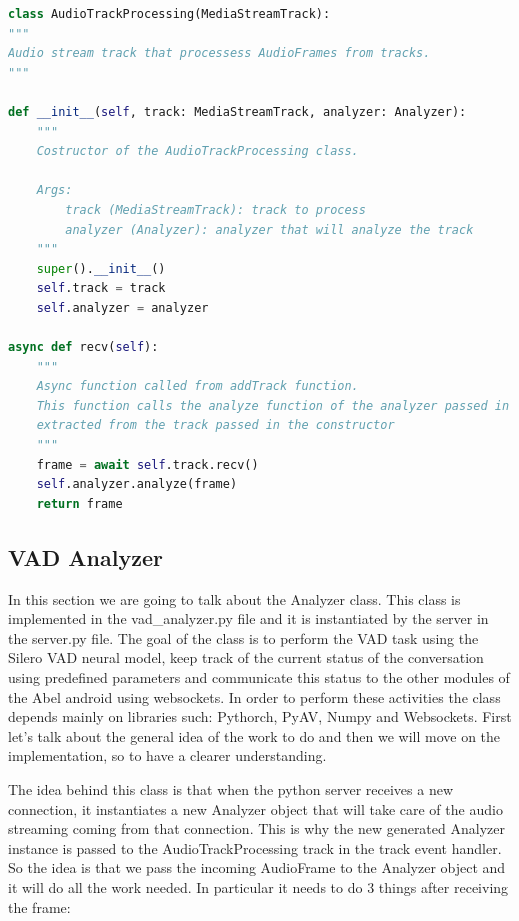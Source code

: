 \documentclass[../main.tex]{subfiles}
\begin{document}
\begin{lstlisting}[language=Python, caption=AudioTrackProcessing class implementation]
class AudioTrackProcessing(MediaStreamTrack):
"""
Audio stream track that processess AudioFrames from tracks.
"""

def __init__(self, track: MediaStreamTrack, analyzer: Analyzer):
    """
    Costructor of the AudioTrackProcessing class.

    Args:
        track (MediaStreamTrack): track to process
        analyzer (Analyzer): analyzer that will analyze the track
    """
    super().__init__()
    self.track = track
    self.analyzer = analyzer

async def recv(self):
    """
    Async function called from addTrack function.
    This function calls the analyze function of the analyzer passed in the constructor on the AudioFrame
    extracted from the track passed in the constructor
    """
    frame = await self.track.recv()
    self.analyzer.analyze(frame)
    return frame    
\end{lstlisting}
\label{listing:AudioTrackProcessing}

\subsection{VAD Analyzer}

In this section we are going to talk about the Analyzer class. This class is implemented in the vad\_analyzer.py file and it is instantiated by the server in the server.py file. The goal of the class is to perform the VAD task using the Silero VAD neural model, keep track of the current status of the conversation using predefined parameters and communicate this status to the other modules of the Abel android using websockets. In order to perform these activities the class depends mainly on libraries such: Pythorch, PyAV, Numpy and Websockets. First let's talk about the general idea of the work to do and then we will move on the implementation, so to have a clearer understanding.

The idea behind this class is that when the python server receives a new connection, it instantiates a new Analyzer object that will take care of the audio streaming coming from that connection. This is why the new generated Analyzer instance is passed to the AudioTrackProcessing track in the track event handler. So the idea is that we pass the incoming AudioFrame to the Analyzer object and it will do all the work needed. In particular it needs to do 3 things after receiving the frame:
\end{document}
